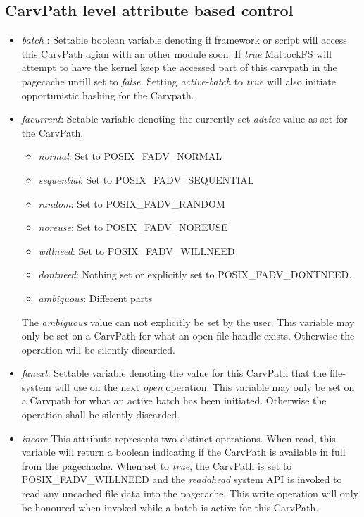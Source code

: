 \begin{Itemize}
\section{CarvPath level attribute based control}
\begin{itemize}
\item \emph{batch} : Settable boolean variable denoting if framework or script will access this CarvPath agian with an other module soon. If \emph{true} MattockFS will attempt to have the kernel keep the accessed part of this carvpath in the pagecache untill set to \emph{false}. Setting \emph{active-batch} to \emph{true} will also initiate opportunistic hashing for the Carvpath.
\item \emph{facurrent}: Setable variable denoting the currently set \emph{advice} value as set for the CarvPath.
\begin{itemize}
\item \emph{normal}: Set to POSIX\_FADV\_NORMAL
\item \emph{sequential}: Set to POSIX\_FADV\_SEQUENTIAL
\item \emph{random}: Set to POSIX\_FADV\_RANDOM
\item \emph{noreuse}: Set to POSIX\_FADV\_NOREUSE
\item \emph{willneed}: Set to  POSIX\_FADV\_WILLNEED
\item \emph{dontneed}: Nothing set or explicitly set to POSIX\_FADV\_DONTNEED.
\item \emph{ambiguous}: Different parts 
\end{itemize} 
The \emph{ambiguous} value can not explicitly be set by the user. This variable may only be set on a CarvPath for what an open file handle exists. Otherwise the operation will be silently discarded.
\item \emph{fanext}: Settable variable denoting the value for this CarvPath that the file-system will use on the next \emph{open} operation. This variable may only be set on a Carvpath for what an active batch has been initiated. Otherwise the operation shall be silently discarded.
\item \emph{incore} This attribute represents two distinct operations. When read, this variable will return a boolean indicating if the CarvPath is available in full from the pagechache. When set to \emph{true}, the CarvPath is set to POSIX\_FADV\_WILLNEED and the \emph{readahead} system API is invoked to read any uncached file data into the pagecache. This write operation will only be honoured when invoked while a batch is active for this CarvPath. 

\end{itemize}
\end{Itemize}
